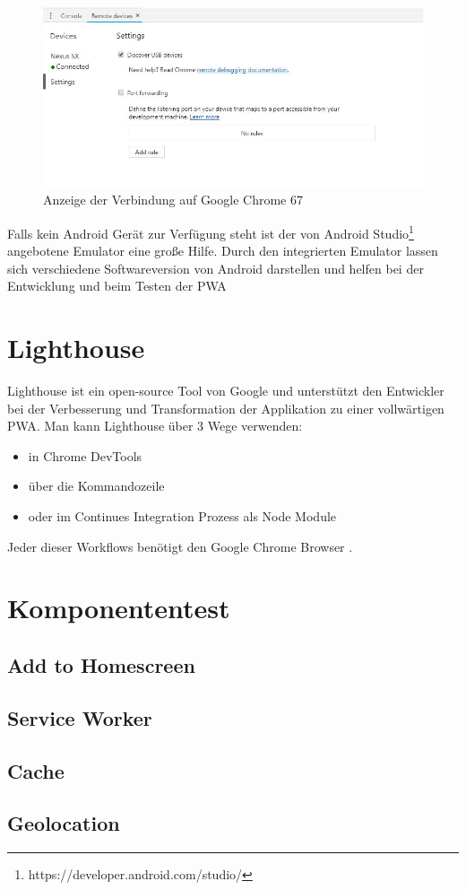 \begin{figure}[h]
	\centering
	\includegraphics[width=14cm]{BilderAllgemein/DevToolsChrome}\medskip
	\caption{Anzeige der Verbindung auf Google Chrome 67}
	\label{fig:DevToolsChrome}
\end{figure}

Falls kein Android Gerät zur Verfügung steht ist der von Android Studio\footnote{https://developer.android.com/studio/} angebotene Emulator eine große Hilfe. Durch den integrierten Emulator lassen sich verschiedene Softwareversion von Android darstellen und helfen bei der Entwicklung und beim Testen der \acs{PWA}

\section{Lighthouse}
Lighthouse ist ein open-source Tool von Google und unterstützt den Entwickler bei der Verbesserung und Transformation der Applikation zu einer vollwärtigen \acs{PWA}. Man kann Lighthouse über 3 Wege verwenden:
\begin{itemize}
    \item  in Chrome DevTools
	\item  über die Kommandozeile
	\item  oder im Continues Integration Prozess als Node Module
\end{itemize}
Jeder dieser Workflows benötigt den Google Chrome Browser \cite{Lighthouse}.

\section{Komponententest}



\subsection{Add to Homescreen}



\subsection{Service Worker}



\subsection{Cache}



\subsection{Geolocation}




